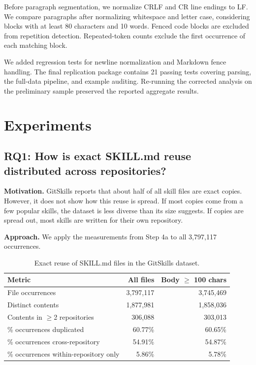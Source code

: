 \documentclass[sigconf,review]{acmart}
\begin{document}
Before paragraph segmentation, we normalize CRLF and CR
line endings to LF. We compare paragraphs after normalizing
whitespace and letter case, considering blocks with at least
80 characters and 10 words. Fenced code blocks are excluded
from repetition detection. Repeated-token counts exclude
the first occurrence of each matching block.

We added regression tests for newline normalization and
Markdown fence handling. The final replication package contains 21 passing tests covering parsing, the full-data pipeline, and example auditing. Re-running the corrected analysis on the preliminary sample preserved
the reported aggregate results.

\section{Experiments}
\label{Section:Result}

\subsection{RQ1: How is exact SKILL.md reuse distributed across repositories?}
\textbf{Motivation.}
GitSkills reports that about half of all skill files are exact copies.
However, it does not show how this reuse is spread.
If most copies come from a few popular skills, the dataset is less diverse than its size suggests.
If copies are spread out, most skills are written for their own repository.

\textbf{Approach.}
We apply the measurements from Step 4a to all 3{,}797{,}117 occurrences.

\begin{table}[t]
  \caption{Exact reuse of SKILL.md files in the GitSkills dataset.}
  \label{tab:rq1-overview}
  \centering
  \small
  \begin{tabular}{lrr}
    \toprule
    Metric & All files & Body $\geq$ 100 chars \\
    \midrule
    File occurrences                      & 3{,}797{,}117 & 3{,}745{,}469 \\
    Distinct contents                     & 1{,}877{,}981 & 1{,}858{,}036 \\
    Contents in $\geq$2 repositories      & 306{,}088     & 303{,}013 \\
    \% occurrences duplicated             & 60.77\%        & 60.65\% \\
    \% occurrences cross-repository       & 54.91\%        & 54.87\% \\
    \% occurrences within-repository only & 5.86\%         & 5.78\% \\
    \bottomrule
  \end{tabular}
\end{table}
\end{document}
